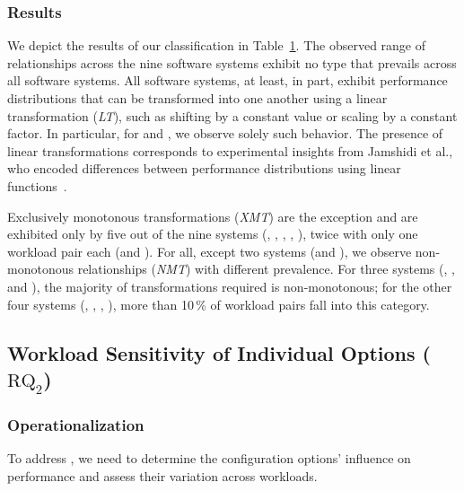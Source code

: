 {{\begin{table}
\begin{tabular}{p{1.1cm}rrrrrrr}
	\bottomrule
	\end{tabular}
	\label{tab:categorization_counts}
\end{table}

\subsubsection{Results}
{\color{black}
We depict the results of our classification in Table~\ref{tab:categorization_counts}. The observed range of relationships across the nine software systems exhibit no type that prevails across all software systems. 
All software systems, at least, in part, exhibit performance distributions that can be transformed into one another using a linear transformation (\textit{\colorbox{lt-color!60}{LT}}), such as shifting by a constant value or scaling by a constant factor. In particular, for \jumper and \xzwo, we observe solely such behavior. The presence of linear transformations corresponds to experimental insights from Jamshidi et al., who encoded differences between performance distributions using linear functions~\cite{jamishidi_transfer_2017}.

Exclusively monotonous transformations (\textit{\colorbox{xmt-color!60}{XMT}}) are the exception and are exhibited only by five out of the nine systems (\kanzi, \batik, \xz, \lrzip, \zdrei), twice with only one workload pair each (\xz and \zdrei).  
For all, except two systems (\jumper and \xzwo), we observe non-monotonous relationships (\textit{\colorbox{nmt-color!60}{NMT}}) with different prevalence.  For three systems (\dconvert, \htwo, and \zdrei), the majority of transformations required is non-monotonous; for the other four systems (\kanzi, \batik, \xz, \lrzip), more than 10\,\% of workload pairs fall into this category.

\subsection{Workload Sensitivity of Individual Options ($\text{RQ}_\text{2}$)}\label{sec:rq2}
\subsubsection{Operationalization}
To address , we need to determine the configuration options’ influence on performance and assess their variation across workloads. 
}}}
